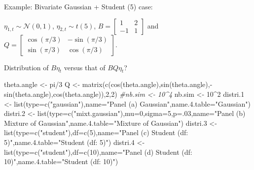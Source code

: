 \documentclass[
]{book}
\newenvironment{Shaded}{\begin{snugshade}}{\end{snugshade}}
\newcommand{\AttributeTok}[1]{\textcolor[rgb]{0.77,0.63,0.00}{#1}}
\newcommand{\CommentTok}[1]{\textcolor[rgb]{0.56,0.35,0.01}{\textit{#1}}}
\newcommand{\DecValTok}[1]{\textcolor[rgb]{0.00,0.00,0.81}{#1}}
\newcommand{\FloatTok}[1]{\textcolor[rgb]{0.00,0.00,0.81}{#1}}
\newcommand{\FunctionTok}[1]{\textcolor[rgb]{0.00,0.00,0.00}{#1}}
\newcommand{\NormalTok}[1]{#1}
\newcommand{\OtherTok}[1]{\textcolor[rgb]{0.56,0.35,0.01}{#1}}
\newcommand{\SpecialCharTok}[1]{\textcolor[rgb]{0.00,0.00,0.00}{#1}}
\newcommand{\StringTok}[1]{\textcolor[rgb]{0.31,0.60,0.02}{#1}}
\theoremstyle{definition}
\theoremstyle{definition}
\theoremstyle{definition}
\theoremstyle{definition}
\theoremstyle{remark}
\begin{document}
Example: Bivariate Gaussian + Student (5) case:

\(\eta_{1,t} \sim \mathcal{N}(0,1)\), \(\eta_{2,t} \sim t(5)\),
\(B = \left[\begin{array}{cc} 1 & 2 \\ -1 & 1 \end{array}\right]\) and
\(Q = \left[\begin{array}{cc} \cos(\pi/3) & -\sin(\pi/3) \\ \sin(\pi/3) & \cos(\pi/3) \end{array}\right]\).

Distribution of \(B \eta_t\) versus that of \(BQ\eta_t\)?

\begin{Shaded}
\begin{Highlighting}[]
\NormalTok{theta.angle }\OtherTok{\textless{}{-}}\NormalTok{ pi}\SpecialCharTok{/}\DecValTok{3}
\NormalTok{Q }\OtherTok{\textless{}{-}} \FunctionTok{matrix}\NormalTok{(}\FunctionTok{c}\NormalTok{(}\FunctionTok{cos}\NormalTok{(theta.angle),}\FunctionTok{sin}\NormalTok{(theta.angle),}\SpecialCharTok{{-}}\FunctionTok{sin}\NormalTok{(theta.angle),}\FunctionTok{cos}\NormalTok{(theta.angle)),}\DecValTok{2}\NormalTok{,}\DecValTok{2}\NormalTok{)}
\CommentTok{\#nb.sim \textless{}{-} 10\^{}4}
\NormalTok{nb.sim }\OtherTok{\textless{}{-}} \DecValTok{10}\SpecialCharTok{\^{}}\DecValTok{2}
\NormalTok{distri}\FloatTok{.1} \OtherTok{\textless{}{-}} \FunctionTok{list}\NormalTok{(}\AttributeTok{type=}\FunctionTok{c}\NormalTok{(}\StringTok{"gaussian"}\NormalTok{),}\AttributeTok{name=}\StringTok{"Panel (a) Gaussian"}\NormalTok{,}\AttributeTok{name.4.table=}\StringTok{"Gaussian"}\NormalTok{)}
\NormalTok{distri}\FloatTok{.2} \OtherTok{\textless{}{-}} \FunctionTok{list}\NormalTok{(}\AttributeTok{type=}\FunctionTok{c}\NormalTok{(}\StringTok{"mixt.gaussian"}\NormalTok{),}\AttributeTok{mu=}\DecValTok{0}\NormalTok{,}\AttributeTok{sigma=}\DecValTok{5}\NormalTok{,}\AttributeTok{p=}\NormalTok{.}\DecValTok{03}\NormalTok{,}\AttributeTok{name=}\StringTok{"Panel (b) Mixture of Gaussian"}\NormalTok{,}\AttributeTok{name.4.table=}\StringTok{"Mixture of Gaussian"}\NormalTok{)}
\NormalTok{distri}\FloatTok{.3} \OtherTok{\textless{}{-}} \FunctionTok{list}\NormalTok{(}\AttributeTok{type=}\FunctionTok{c}\NormalTok{(}\StringTok{"student"}\NormalTok{),}\AttributeTok{df=}\FunctionTok{c}\NormalTok{(}\DecValTok{5}\NormalTok{),}\AttributeTok{name=}\StringTok{"Panel (c) Student (df: 5)"}\NormalTok{,}\AttributeTok{name.4.table=}\StringTok{"Student (df: 5)"}\NormalTok{)}
\NormalTok{distri}\FloatTok{.4} \OtherTok{\textless{}{-}} \FunctionTok{list}\NormalTok{(}\AttributeTok{type=}\FunctionTok{c}\NormalTok{(}\StringTok{"student"}\NormalTok{),}\AttributeTok{df=}\FunctionTok{c}\NormalTok{(}\DecValTok{10}\NormalTok{),}\AttributeTok{name=}\StringTok{"Panel (d) Student (df: 10)"}\NormalTok{,}\AttributeTok{name.4.table=}\StringTok{"Student (df: 10)"}\NormalTok{)}

\end{Highlighting}
\end{Shaded}
\end{document}
